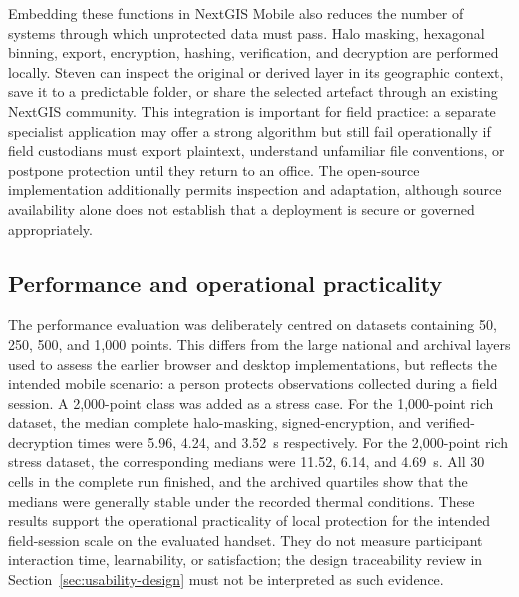 \documentclass[a4paper,UKenglish,cleveref,autoref,thm-restate]{lipics-v2021}
\begin{document}
Embedding these functions in NextGIS Mobile also reduces the number of systems through which unprotected data must pass. Halo masking, hexagonal binning, export, encryption, hashing, verification, and decryption are performed locally. Steven can inspect the original or derived layer in its geographic context, save it to a predictable folder, or share the selected artefact through an existing NextGIS community. This integration is important for field practice: a separate specialist application may offer a strong algorithm but still fail operationally if field custodians must export plaintext, understand unfamiliar file conventions, or postpone protection until they return to an office. The open-source implementation additionally permits inspection and adaptation, although source availability alone does not establish that a deployment is secure or governed appropriately.

\subsection{Performance and operational practicality}

The performance evaluation was deliberately centred on datasets containing 50, 250, 500, and 1,000 points. This differs from the large national and archival layers used to assess the earlier browser and desktop implementations, but reflects the intended mobile scenario: a person protects observations collected during a field session. A 2,000-point class was added as a stress case. For the 1,000-point rich dataset, the median complete halo-masking, signed-encryption, and verified-decryption times were 5.96, 4.24, and 3.52~s respectively. For the 2,000-point rich stress dataset, the corresponding medians were 11.52, 6.14, and 4.69~s. All 30 cells in the complete run finished, and the archived quartiles show that the medians were generally stable under the recorded thermal conditions. These results support the operational practicality of local protection for the intended field-session scale on the evaluated handset. They do not measure participant interaction time, learnability, or satisfaction; the design traceability review in Section~\ref{sec:usability-design} must not be interpreted as such evidence.
\end{document}

